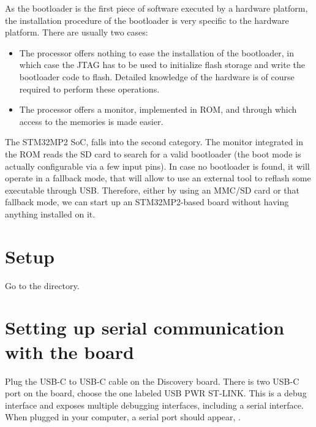 
As the bootloader is the first piece of software executed by a
hardware platform, the installation procedure of the bootloader is
very specific to the hardware platform. There are usually two cases:

\begin{itemize}

\item The processor offers nothing to ease the installation of the
  bootloader, in which case the JTAG has to be used to initialize
  flash storage and write the bootloader code to flash. Detailed
  knowledge of the hardware is of course required to perform these
  operations.

\item The processor offers a monitor, implemented in ROM, and through
  which access to the memories is made easier.

\end{itemize}

The STM32MP2 SoC, falls into the second category. The monitor
integrated in the ROM reads the SD card to search for a valid
bootloader (the boot mode is actually configurable via a few input
pins). In case no bootloader is found, it will operate in a fallback
mode, that will allow to use an external tool to reflash some
executable through USB. Therefore, either by using an MMC/SD card or
that fallback mode, we can start up an STM32MP2-based board without
having anything installed on it.
\section{Setup}

Go to the  directory.

\section{Setting up serial communication with the board}

Plug the USB-C to USB-C cable on the Discovery board. There is
two USB-C port on the board, choose the one labeled USB PWR ST-LINK.
This is a debug interface and exposes multiple debugging interfaces,
including a serial interface. When plugged in your computer, a serial
port should appear, {\tt \hosttty}.

